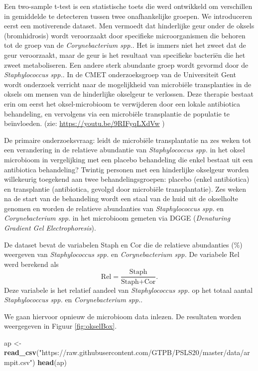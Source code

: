 \documentclass[
  12pt,dutch,coursenotes]{book}
\newenvironment{Shaded}{\begin{snugshade}}{\end{snugshade}}
\newcommand{\KeywordTok}[1]{\textcolor[rgb]{0.13,0.29,0.53}{\textbf{#1}}}
\newcommand{\NormalTok}[1]{#1}
\newcommand{\StringTok}[1]{\textcolor[rgb]{0.31,0.60,0.02}{#1}}
\theoremstyle{definition}
\theoremstyle{definition}
\theoremstyle{definition}
\theoremstyle{remark}
\begin{document}
Een two-sample t-test is een statistische toets die werd ontwikkeld om verschillen in gemiddelde te detecteren tussen twee onafhankelijke groepen. We introduceren eerst een motiverende dataset.
Men vermoedt dat hinderlijke geur onder de oksels (bromhidrosis) wordt veroorzaakt door specifieke microorganismen die behoren tot de groep van de \emph{Corynebacterium spp.}. Het is immers niet het zweet dat de geur veroorzaakt, maar de geur is het resultaat van specifieke bacteriën die het zweet metaboliseren. Een andere sterk abundante groep wordt gevormd door de \emph{Staphylococcus spp.}. In de CMET onderzoeksgroep van de Universiteit Gent wordt onderzoek verricht naar de mogelijkheid van microbiële transplanties in de oksels om mensen van de hinderlijke okselgeur te verlossen. Deze therapie bestaat erin om eerst het oksel-microbioom te verwijderen door een lokale antibiotica behandeling, en vervolgens via een microbiële transplantie de populatie te beïnvloeden. (zie: \url{https://youtu.be/9RIFyqLXdVw} )

De primaire onderzoeksvraag: leidt de microbiële transplantatie na zes weken tot een verandering in de relatieve abundantie van \emph{Staphylococcus spp.} in het oksel microbioom in vergelijking met een placebo behandeling die enkel bestaat uit een antibiotica behandeling?
Twintig personen met een hinderlijke okselgeur worden willekeurig toegekend aan twee behandelingsgroepen: placebo (enkel antibiotica) en transplantie (antibiotica, gevolgd door microbiële transplantatie).
Zes weken na de start van de behandeling wordt een staal van de huid uit de okselholte genomen en worden de relatieve abundanties van \emph{Staphylococcus spp.} en \emph{Corynebacterium spp.} in het microbioom gemeten via DGGE (\emph{Denaturing Gradient Gel Electrophoresis}).

De dataset bevat de variabelen Staph en Cor die de relatieve abundanties (\%) weergeven van \emph{Staphylococcus spp.} en \emph{Corynebacterium spp.} De variabele Rel werd berekend als
\[
    \text{Rel}=\frac{\text{Staph}}{\text{Staph}+\text{Cor}}.
  \]
Deze variabele is het relatief aandeel van \emph{Staphylococcus spp.} op het totaal aantal \emph{Staphylococcus spp.} en \emph{Corynebacterium spp.}.

We gaan hiervoor opnieuw de microbioom data inlezen.
De resultaten worden weergegeven in Figuur \ref{fig:okselBox}.

\begin{Shaded}
\begin{Highlighting}[]
\NormalTok{ap \textless{}{-}}\StringTok{ }\KeywordTok{read\_csv}\NormalTok{(}\StringTok{"https://raw.githubusercontent.com/GTPB/PSLS20/master/data/armpit.csv"}\NormalTok{)}
\KeywordTok{head}\NormalTok{(ap)}
\end{Highlighting}
\end{Shaded}
\end{document}
